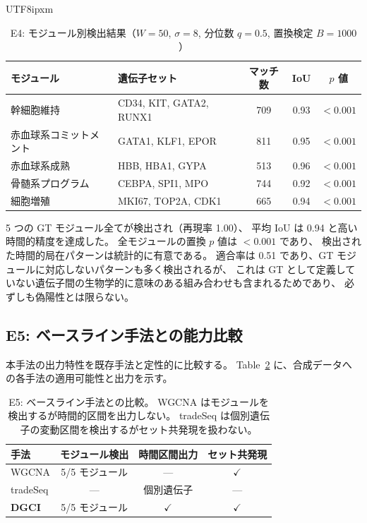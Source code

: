\documentclass[11pt,a4paper]{article}
\begin{document}
\begin{CJK}{UTF8}{ipxm}
\begin{table}[t]
\centering
\caption{E4: モジュール別検出結果（$W=50$, $\sigma=8$, 分位数 $q=0.5$, 置換検定 $B=1000$）}
\label{tab:modules}
\begin{tabular}{l|l|cc|c}
\toprule
モジュール & 遺伝子セット & マッチ数 & IoU & $p$ 値 \\
\midrule
幹細胞維持        & CD34, KIT, GATA2, RUNX1 & 709 & 0.93 & $< 0.001$ \\
赤血球系コミットメント & GATA1, KLF1, EPOR   & 811 & 0.95 & $< 0.001$ \\
赤血球系成熟      & HBB, HBA1, GYPA         & 513 & 0.96 & $< 0.001$ \\
骨髄系プログラム   & CEBPA, SPI1, MPO        & 744 & 0.92 & $< 0.001$ \\
細胞増殖          & MKI67, TOP2A, CDK1       & 665 & 0.94 & $< 0.001$ \\
\bottomrule
\end{tabular}
\end{table}

5 つの GT モジュール全てが検出され（再現率 1.00）、
平均 IoU は 0.94 と高い時間的精度を達成した。
全モジュールの置換 $p$ 値は $< 0.001$ であり、
検出された時間的局在パターンは統計的に有意である。
適合率は 0.51 であり、GT モジュールに対応しないパターンも多く検出されるが、
これは GT として定義していない遺伝子間の生物学的に意味のある組み合わせも含まれるためであり、
必ずしも偽陽性とは限らない。

\subsection{E5: ベースライン手法との能力比較}

本手法の出力特性を既存手法と定性的に比較する。
Table~\ref{tab:baseline-comparison} に、合成データへの各手法の適用可能性と出力を示す。

\begin{table}[t]
\centering
\caption{E5: ベースライン手法との比較。
WGCNA はモジュールを検出するが時間的区間を出力しない。
tradeSeq は個別遺伝子の変動区間を検出するがセット共発現を扱わない。}
\label{tab:baseline-comparison}
\begin{tabular}{l|ccc}
\toprule
手法 & モジュール検出 & 時間区間出力 & セット共発現 \\
\midrule
WGCNA          & 5/5 モジュール & ---     & $\checkmark$ \\
tradeSeq       & ---            & 個別遺伝子 & ---          \\
\textbf{DGCI}  & 5/5 モジュール & $\checkmark$ & $\checkmark$ \\
\bottomrule
\end{tabular}
\end{table}


\end{CJK}
\end{document}
